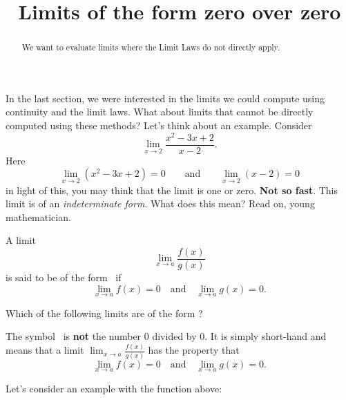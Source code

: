 \documentclass{ximera}
\title[Dig-In:]{Limits of the form zero over zero}
\begin{document}
\begin{abstract}
  We want to evaluate limits where the Limit Laws do not directly apply. 
\end{abstract}

\maketitle

In the last section, we were interested in the limits we could compute
using continuity and the limit laws. What about limits that cannot be
directly computed using these methods? Let's think about an example. Consider
\[
\lim_{x\to 2}\frac{x^2-3x+2}{x-2}.
\]
Here 
\[
\lim_{x\to 2}\left(x^2-3x+2\right) = 0\qquad\text{and}\qquad \lim_{x\to
  2}\left(x-2\right) = 0
\]
in light of this, you may think that the limit is one or
zero. \textbf{Not so fast}. This limit is of an \textit{indeterminate
  form}. What does this mean? Read on, young mathematician.

\begin{definition}
  A limit
  \[
  \lim_{x\to a} \frac{f(x)}{g(x)}
  \]
  is said to be of the form \zeroOverZero\ if
  \[
  \lim_{x\to a} f(x) = 0\quad\text{and}\quad \lim_{x\to a} g(x) =0.
  \]
\end{definition}

\begin{question}
  Which of the following limits are of the form \zeroOverZero?
  \begin{selectAll}
  \end{selectAll}
\end{question}

\begin{warning}
  The symbol \zeroOverZero\ is \textbf{not} the number $0$ divided by
  $0$. It is simply short-hand and means that a limit $\lim_{x\to a}
  \frac{f(x)}{g(x)}$ has the property that
  \[
  \lim_{x\to a} f(x) = 0\quad\text{and}\quad \lim_{x\to a} g(x) =0.
  \]
\end{warning}


Let's consider an example with the function above:
\end{document}
